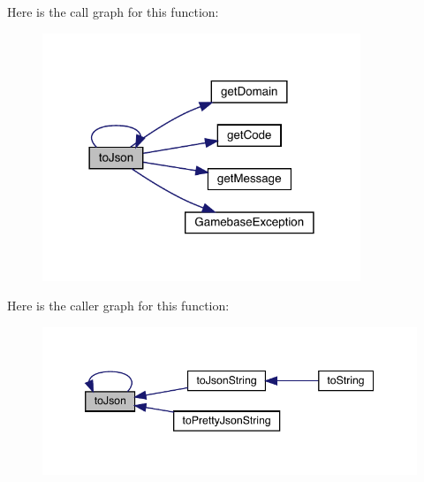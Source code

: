 Here is the call graph for this function\+:
\nopagebreak
\begin{figure}[H]
\begin{center}
\leavevmode
\includegraphics[width=270pt]{classcom_1_1toast_1_1android_1_1gamebase_1_1base_1_1_gamebase_exception_a6b2a39146828e6b135949df810b8e052_cgraph}
\end{center}
\end{figure}
Here is the caller graph for this function\+:
\nopagebreak
\begin{figure}[H]
\begin{center}
\leavevmode
\includegraphics[width=346pt]{classcom_1_1toast_1_1android_1_1gamebase_1_1base_1_1_gamebase_exception_a6b2a39146828e6b135949df810b8e052_icgraph}
\end{center}
\end{figure}
\mbox{\label{classcom_1_1toast_1_1android_1_1gamebase_1_1base_1_1_gamebase_exception_a58acf6402880e9769d79d8667581fa6a}} 
